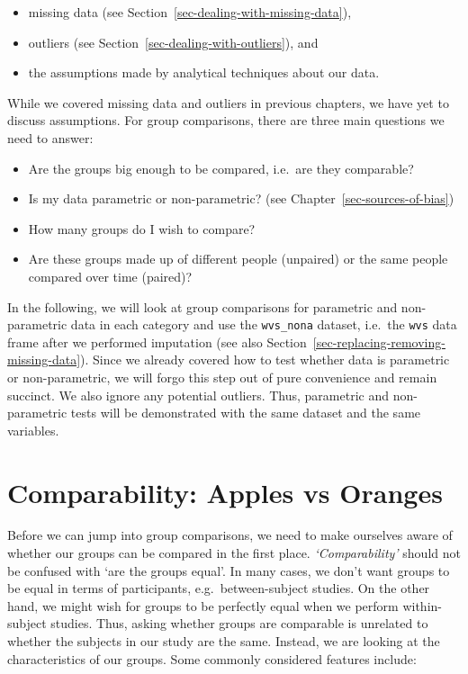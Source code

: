\documentclass[
  letterpaper,
]{krantz}
\begin{document}
\begin{itemize}
\item
  missing data (see Section~\ref{sec-dealing-with-missing-data}),
\item
  outliers (see Section~\ref{sec-dealing-with-outliers}), and
\item
  the assumptions made by analytical techniques about our data.
\end{itemize}

While we covered missing data and outliers in previous chapters, we have
yet to discuss assumptions. For group comparisons, there are three main
questions we need to answer:

\begin{itemize}
\item
  Are the groups big enough to be compared, i.e.~are they comparable?
\item
  Is my data parametric or non-parametric? (see
  Chapter~\ref{sec-sources-of-bias})
\item
  How many groups do I wish to compare?
\item
  Are these groups made up of different people (unpaired) or the same
  people compared over time (paired)?
\end{itemize}

In the following, we will look at group comparisons for parametric and
non-parametric data in each category and use the \texttt{wvs\_nona}
dataset, i.e.~the \texttt{wvs} data frame after we performed imputation
(see also Section~\ref{sec-replacing-removing-missing-data}). Since we
already covered how to test whether data is parametric or
non-parametric, we will forgo this step out of pure convenience and
remain succinct. We also ignore any potential outliers. Thus, parametric
and non-parametric tests will be demonstrated with the same dataset and
the same variables.

\section{Comparability: Apples vs
Oranges}\label{sec-comparability-apples-vs-oranges}

Before we can jump into group comparisons, we need to make ourselves
aware of whether our groups can be compared in the first place.
\emph{`Comparability'} should not be confused with `are the groups
equal'. In many cases, we don't want groups to be equal in terms of
participants, e.g.~between-subject studies. On the other hand, we might
wish for groups to be perfectly equal when we perform within-subject
studies. Thus, asking whether groups are comparable is unrelated to
whether the subjects in our study are the same. Instead, we are looking
at the characteristics of our groups. Some commonly considered features
include:
\end{document}
